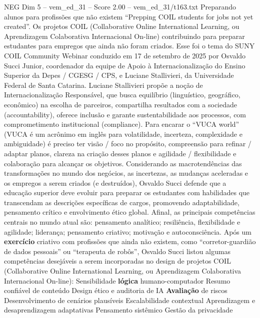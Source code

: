 \begin{textsample}{NEG Dim 5 – vem\_ed\_31 – Score 2.00 – vem\_ed\_31/t163.txt}  \label{ex:f5_neg_123}
Preparando alunos para profissões que não existem “Prepping COIL students for jobs not yet created”.
Os projetos COIL (Collaborative Online International Learning, ou Aprendizagem Colaborativa Internacional On-line) contribuindo para preparar estudantes para empregos que ainda não foram criados.
Esse foi o tema do SUNY COIL Community Webinar conduzido em 17 de setembro de 2025 por Osvaldo Succi Junior, coordenador da equipe de Apoio à Internacionalização do Ensino Superior da Depes / CGESG / CPS, e Luciane Stallivieri, da Universidade Federal de Santa Catarina.
Luciane Stallivieri propõe a noção de Internacionalização Responsável, que busca equilíbrio (linguístico, geográfico, econômico) na escolha de parceiros, compartilha resultados com a sociedade (accountability), oferece inclusão e garante sustentabilidade aos processos, com comprometimento institucional (compliance).
Para encarar o “VUCA world” (VUCA é um acrônimo em inglês para volatilidade, incerteza, complexidade e ambiguidade) é preciso ter visão / foco no propósito, compreensão para refinar / adaptar planos, clareza na criação desses planos e agilidade / flexibilidade e colaboração para alcançar os objetivos.
Considerando as macrotendências das transformações no mundo dos negócios, as incertezas, as mudanças aceleradas e os empregos a serem criados (e destruídos), Osvaldo Succi defende que a educação superior deve evoluir para preparar os estudantes com habilidades que transcendam as descrições específicas de cargos, promovendo adaptabilidade, pensamento crítico e envolvimento ético global.
Afinal, as principais competências centrais no mundo atual são: pensamento analítico; resiliência, flexibilidade e agilidade; liderança; pensamento criativo; motivação e autoconsciência.
Após um \textbf{exercício} criativo com profissões que ainda não existem, como “corretor-guardião de dados pessoais” ou “terapeuta de robôs”, Osvaldo Succi listou algumas competências desejáveis a serem incorporadas no design de projetos COIL (Collaborative Online International Learning, ou Aprendizagem Colaborativa Internacional On-line): Sensibilidade \textbf{lógica} humano-computador Resumo confiável de conteúdo Design ético e auditoria de IA \textbf{Avaliação} de riscos Desenvolvimento de cenários plausíveis Escalabilidade contextual Aprendizagem e desaprendizagem adaptativas Pensamento sistêmico Gestão da privacidade

\end{textsample}
